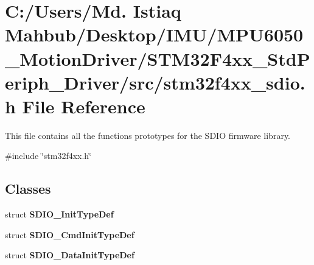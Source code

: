 \section{C\+:/\+Users/\+Md. Istiaq Mahbub/\+Desktop/\+I\+M\+U/\+M\+P\+U6050\+\_\+\+Motion\+Driver/\+S\+T\+M32\+F4xx\+\_\+\+Std\+Periph\+\_\+\+Driver/src/stm32f4xx\+\_\+sdio.h File Reference}
\label{stm32f4xx__sdio_8h}


This file contains all the functions prototypes for the S\+D\+IO firmware library.  


{\ttfamily \#include \char`\"{}stm32f4xx.\+h\char`\"{}}\newline
\subsection*{Classes}
\begin{DoxyCompactItemize}
\item 
struct \textbf{ S\+D\+I\+O\+\_\+\+Init\+Type\+Def}
\item 
struct \textbf{ S\+D\+I\+O\+\_\+\+Cmd\+Init\+Type\+Def}
\item 
struct \textbf{ S\+D\+I\+O\+\_\+\+Data\+Init\+Type\+Def}
\end{DoxyCompactItemize}
